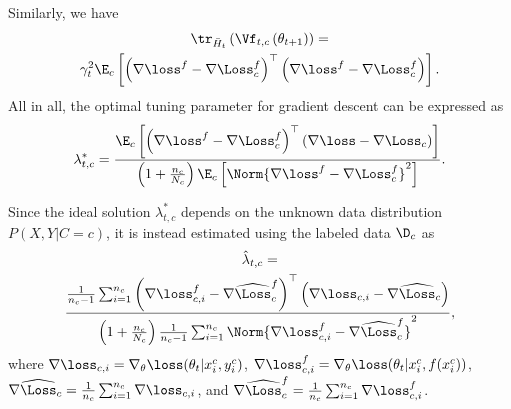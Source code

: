\documentclass[journal]{IEEEtran}
\begin{document}
Similarly, we have
\begin{multline}
\tr_{\bar{H}_t}\left(
    \Vf_{t, c}\left( \theta_{t+1} \right)
\right) = \\
    \gamma_t^2 \E_c\left[
        \left( \nabla \loss^f - \nabla \Loss^f_c \right)^\top
        \left( \nabla \loss^f - \nabla \Loss^f_c \right)
    \right].
\end{multline}
All in all, the optimal tuning parameter for gradient descent can be expressed as
\begin{equation}
\begin{split}
\lambda^{*}_{t, c} = \frac{
        \E_c\left[
            \left( \nabla \loss^f - \nabla \Loss^f_c \right)^\top
            \left( \nabla \loss - \nabla \Loss_c \right)
        \right]
    }{
        \left( 1 + \frac{n_c}{N_c} \right) \E_c\left[
            \Norm{\nabla \loss^f - \nabla \Loss^f_c}^2
        \right]
    }.
\end{split}    
\end{equation}

Since the ideal solution $\lambda^{*}_{t, c}$ depends on the unknown data distribution $P(X, Y | C=c)$, it is instead estimated using the labeled data $\D_c$ as
\begin{multline}
\hat{\lambda}_{t, c} = \\
    \frac{
        \frac{1}{n_c - 1}
        \sum_{i=1}^{n_c}
            \left( \nabla \loss^f_{c, i} - \nabla \widehat{\Loss}^f_c \right)^\top
            \left( \nabla \loss_{c, i} - \nabla \widehat{\Loss}_c \right)
    }{
        \left( 1 + \frac{n_c}{N_c} \right) 
        \frac{1}{n_c - 1}
        \sum_{i=1}^{n_c}
            \Norm{\nabla \loss^f_{c, i} - \nabla \widehat{\Loss}^f_c}^2
    },
\end{multline}
where $\nabla \loss_{c, i} = \nabla_\theta \loss(\theta_t | x^c_i, y^c_i)$, $\nabla \loss^f_{c, i} = \nabla_\theta \loss(\theta_t | x^c_i, f(x^c_i))$, $\nabla \widehat{\Loss}_c = \frac{1}{n_c} \sum_{i=1}^{n_c} \nabla \loss_{c, i}$, and $\nabla \widehat{\Loss}^f_c = \frac{1}{n_c} \sum_{i=1}^{n_c} \nabla \loss^f_{c, i}$.
\end{document}
